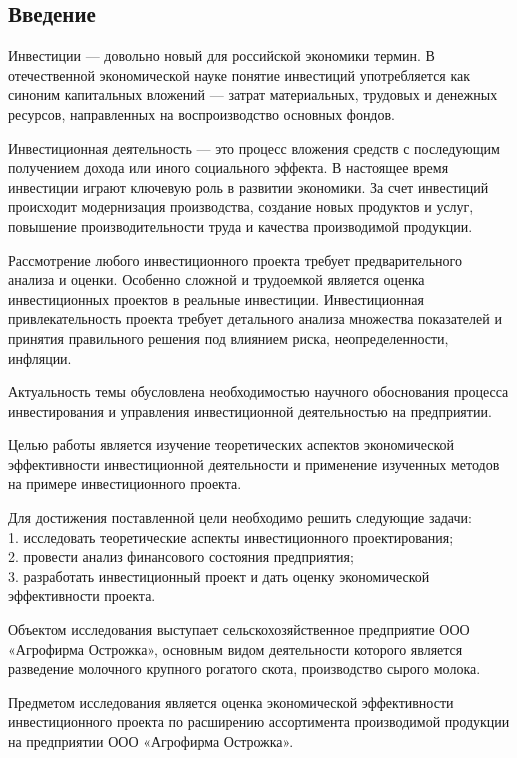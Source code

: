 \subsection*{Введение}
Инвестиции --- довольно новый для российской экономики термин. В отечественной экономической науке понятие инвестиций употребляется как синоним капитальных вложений --- затрат материальных, трудовых и денежных ресурсов, направленных на воспроизводство основных фондов.

Инвестиционная деятельность --- это процесс вложения средств с последующим получением дохода или иного социального эффекта. В настоящее время инвестиции играют ключевую роль в развитии экономики. За счет инвестиций происходит модернизация производства, создание новых продуктов и услуг, повышение производительности труда и качества производимой продукции.

Рассмотрение любого инвестиционного проекта требует предварительного анализа и оценки. Особенно сложной и трудоемкой является оценка инвестиционных проектов в реальные инвестиции. Инвестиционная привлекательность проекта требует детального анализа множества показателей и принятия правильного решения под влиянием риска, неопределенности, инфляции.

Актуальность темы обусловлена необходимостью научного обоснования процесса инвестирования и управления инвестиционной деятельностью на предприятии.

Целью работы является изучение теоретических аспектов экономической эффективности инвестиционной деятельности и применение изученных методов на примере инвестиционного проекта.

Для достижения поставленной цели необходимо решить следующие задачи:\\
1. исследовать теоретические аспекты инвестиционного проектирования;\\
2. провести анализ финансового состояния предприятия;\\
3. разработать инвестиционный проект и дать оценку экономической эффективности проекта.

Объектом исследования выступает сельскохозяйственное предприятие ООО «Агрофирма Острожка», основным видом деятельности которого является разведение молочного крупного рогатого скота, производство сырого молока.

Предметом исследования является оценка экономической эффективности инвестиционного проекта по расширению ассортимента производимой продукции на предприятии ООО «Агрофирма Острожка».

